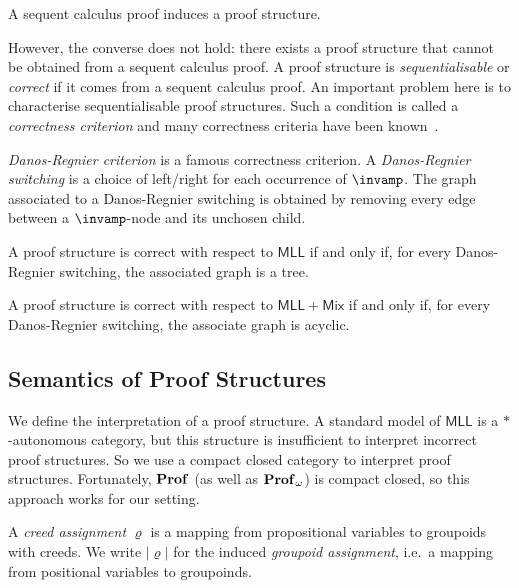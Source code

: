 A sequent calculus proof induces a proof structure.

However, the converse does not hold: there exists a proof structure that cannot be obtained from a sequent calculus proof.
A proof structure is \emph{sequentialisable} or \emph{correct} if it comes from a sequent calculus proof.
An important problem here is to characterise sequentialisable proof structures.
Such a condition is called a \emph{correctness criterion} and many correctness criteria have been known~.

\emph{Danos-Regnier criterion} is a famous correctness criterion.
A \emph{Danos-Regnier switching} is a choice of left/right for each occurrence of \( \llpar \).
The graph associated to a Danos-Regnier switching is obtained by removing every edge between a \( \llpar \)-node and its unchosen child.
\begin{theorem}\label{thm:danos-regnier}
    A proof structure is correct with respect to \( \mathsf{MLL} \) if and only if, for every Danos-Regnier switching, the associated graph is a tree.
\end{theorem}
\begin{theorem}\label{thm:weak-danos-regnier}
    A proof structure is correct with respect to \( \mathsf{MLL+Mix} \) if and only if, for every Danos-Regnier switching, the associate graph is acyclic.
\end{theorem}


\subsection{Semantics of Proof Structures}
We define the interpretation of a proof structure.
A standard model of \( \mathsf{MLL} \) is a \( * \)-autonomous category, but this structure is insufficient to interpret incorrect proof structures.
So we use a compact closed category to interpret proof structures.
Fortunately, \( \mathbf{Prof} \) (as well as \( \mathbf{Prof}_{\omega} \)) is compact closed, so this approach works for our setting.



A \emph{creed assignment} \( \varrho \) is a mapping from propositional variables to groupoids with creeds.
We write \( |\varrho| \) for the induced \emph{groupoid assignment}, i.e.~a mapping from positional variables to groupoinds.

